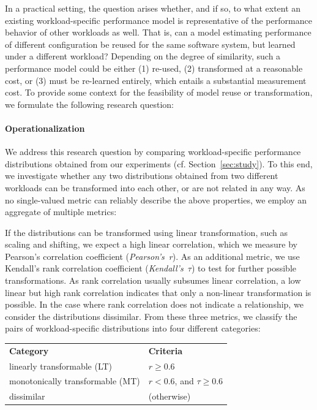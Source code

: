In a practical setting, the question arises whether, and if so, to what extent an existing workload-specific performance model is representative of the performance behavior of other workloads as well. 
That is, can a model estimating performance of different configuration be reused for the same software system, but learned under a different workload?
Depending on the degree of similarity, such a performance model could be either (1) re-used, (2) transformed at a reasonable cost, or (3) must be re-learned entirely, which entails a substantial measurement cost. To provide some context for the feasibility of model reuse or transformation, we formulate the following research question: 


\paragraph*{Operationalization}
We address this research question by comparing workload-specific performance distributions obtained from our experiments (cf. Section~\ref{sec:study}). To this end, we investigate whether any two distributions obtained from two different workloads can be transformed into each other, or are not related in any way. As no single-valued metric can reliably describe the above properties, we employ an aggregate of multiple metrics: 

If the distributions can be transformed using linear transformation, such as scaling and shifting, we expect a high linear correlation, which we measure by Pearson’s correlation coefficient (\emph{Pearson's~r}). As an additional metric, we use Kendall’s rank correlation coefficient (\emph{Kendall's~$\tau$}) to test for further possible transformations. As rank correlation usually subsumes linear correlation, a low linear but high rank correlation indicates that only a non-linear transformation is possible. In the case where rank correlation does not indicate a relationship, we consider the distributions dissimilar. From these three metrics, we classify the pairs of workload-specific distributions into four different categories:
\vspace{1mm}

\begin{tabular}{p{4.4cm}l}
	 \textbf{Category} & \textbf{Criteria} \\
	{linearly transformable (LT)} & $r \geq 0.6$ \\
	{monotonically transformable (MT)} & $r < 0.6$, and $\tau \geq 0.6$ \\
	{dissimilar}  & (otherwise) \\%
\end{tabular}

